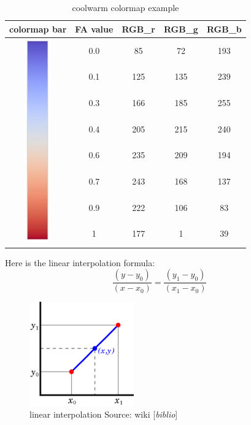 \documentclass[a4paper, 12pt]{report}
\newcommand{\comment}[1]{{\color{red}[\textit{#1}]}}
\begin{document}
\begin{table}[h]
\caption{coolwarm colormap example}
\centering
\begin{tabular}{|c|c|c|c|c|}
\hline
colormap bar     & FA value & RGB\_r & RGB\_g & RGB\_b   \\ \hline
\multirow{8}{*}{\includegraphics{coolwarm_bar} } & 0.0      & 85     & 72     & 193      \\ [5pt] \cline{2-5}
	& 0.1      & 125    & 135    & 239      \\ [6pt] \cline{2-5}
	& 0.3      & 166    & 185    & 255      \\ [6pt] \cline{2-5}
	& 0.4      & 205    & 215    & 240      \\ [6pt] \cline{2-5}
	& 0.6      & 235    & 209    & 194      \\ [6pt] \cline{2-5}
	& 0.7      & 243    & 168    & 137      \\ [6pt] \cline{2-5}
	& 0.9      & 222    & 106    & 83       \\ [6pt] \cline{2-5}
	& 1        & 177    & 1      & 39      \\ [6pt] \hline
\end{tabular}
\label{tbl:coolwarm}
\end{table}

Here is the linear interpolation formula:
\begin{equation*}
 \frac{(y-y_0)}{(x-x_0)} = \frac{(y_1-y_0)}{(x_1-x_0)}
\end{equation*}

\begin{figure}[h]
	\centering
	\includegraphics[width=0.4\textwidth]{interp}
	\caption{ linear interpolation 
Source: wiki \comment{biblio}}
	\label{fig:interp}
\end{figure}
\end{document}
